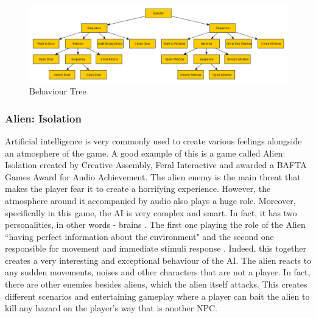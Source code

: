 \documentclass[journal]{IEEEtran}
\begin{document}
\begin{figure}
	\includegraphics[width=\linewidth]{BehaviourTree.PNG}
	\caption{Behaviour Tree \cite{chris2014}}
	\label{fig:bt}
\end{figure}

\subsubsection{Alien: Isolation} %
Artificial intelligence is very commonly used to create various feelings alongside an atmosphere of the game. A good example of this is a game called Alien: Isolation created by Creative Assembly, Feral Interactive and awarded a BAFTA Games Award for Audio Achievement. The alien enemy is the main threat that makes the player fear it to create a horrifying experience. However, the atmosphere around it accompanied by audio also plays a huge role. Moreover, specifically in this game, the AI is very complex and smart. In fact, it has two personalities, in other words - brains \cite{seller2019horrific}. The first one playing the role of the Alien ``having perfect information about the environment" \cite{seller2019horrific} and the second one responsible for movement and immediate stimuli response \cite{seller2019horrific}. Indeed, this together creates a very interesting and exceptional behaviour of the AI. The alien reacts to any sudden movements, noises and other characters that are not a player. In fact, there are other enemies besides aliens, which the alien itself attacks. This creates different scenarios and entertaining gameplay where a player can bait the alien to kill any hazard on the player's way that is another NPC.
\end{document}
